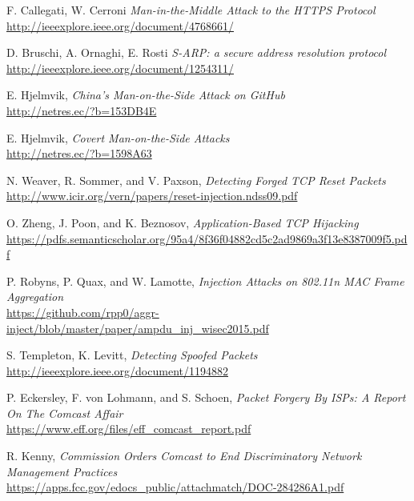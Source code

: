 \documentclass[journal]{IEEEtran}
\begin{document}
\newpage


\begin{thebibliography}{1}

F. Callegati, W. Cerroni \emph{Man-in-the-Middle Attack to the HTTPS Protocol}
\\\url{http://ieeexplore.ieee.org/document/4768661/}

D. Bruschi, A. Ornaghi, E. Rosti \emph{S-ARP: a secure address resolution protocol}
\\\url{http://ieeexplore.ieee.org/document/1254311/}

E. Hjelmvik, \emph{China's Man-on-the-Side Attack on GitHub}
\\\url{http://netres.ec/?b=153DB4E}

E. Hjelmvik, \emph{Covert Man-on-the-Side Attacks}
\\\url{http://netres.ec/?b=1598A63}

N. Weaver, R. Sommer, and V. Paxson, \emph{Detecting Forged TCP Reset Packets}
\\\url{http://www.icir.org/vern/papers/reset-injection.ndss09.pdf}

O. Zheng, J. Poon, and K. Beznosov, \emph{Application-Based TCP Hijacking}
\\\url{https://pdfs.semanticscholar.org/95a4/8f36f04882cd5c2ad9869a3f13e8387009f5.pdf }

P. Robyns, P. Quax, and W. Lamotte, \emph{Injection Attacks on 802.11n MAC Frame Aggregation}
\\\url{https://github.com/rpp0/aggr-inject/blob/master/paper/ampdu\_inj\_wisec2015.pdf }

S. Templeton, K. Levitt, \emph{Detecting Spoofed Packets}
\\\url{http://ieeexplore.ieee.org/document/1194882}

P. Eckersley, F. von Lohmann, and S. Schoen, \emph{Packet Forgery By ISPs: A Report On The Comcast Affair}
\\\url{https://www.eff.org/files/eff\_comcast\_report.pdf}

R. Kenny, \emph{Commission Orders Comcast to End Discriminatory Network Management Practices}
\\\url{https://apps.fcc.gov/edocs\_public/attachmatch/DOC-284286A1.pdf}

\end{thebibliography}
\end{document}
